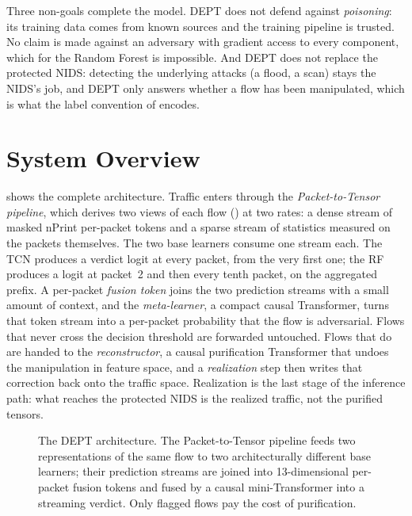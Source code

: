 Three non-goals complete the model. DEPT does not defend against \emph{poisoning}: its
training data comes from known sources and the training pipeline is trusted. No claim
is made against an adversary with gradient access to every component, which for the
Random Forest is impossible. And DEPT does not replace the protected \ac{NIDS}:
detecting the underlying attacks (a flood, a scan) stays the \ac{NIDS}'s job, and DEPT
only answers whether a flow has been manipulated, which is what the label convention of
 encodes.

\section{System Overview}\label{sec:sol-overview}
 shows the complete architecture. Traffic enters through the
\emph{Packet-to-Tensor pipeline}, which derives two views of each flow
() at two rates: a dense stream of masked nPrint per-packet
tokens and a sparse stream of statistics measured on the packets themselves. The two base learners
consume one stream each. The \ac{TCN} produces a verdict logit at every packet, from
the very first one; the \ac{RF} produces a logit at packet~2 and then every tenth
packet, on the aggregated prefix. A per-packet \emph{fusion token} joins the two
prediction streams with a small amount of context, and the \emph{meta-learner}, a
compact causal Transformer, turns that token stream into a per-packet probability that
the flow is adversarial. Flows that never cross the decision threshold are forwarded
untouched. Flows that do are handed to the \emph{reconstructor}, a causal purification
Transformer that undoes the manipulation in feature space, and a \emph{realization} step
then writes that correction back onto the traffic space. Realization is the last
stage of the inference path: what reaches the protected \ac{NIDS} is the realized
traffic, not the purified tensors.

\begin{figure}[htbp]
    \centering
    
    \caption[The DEPT architecture.]{The DEPT architecture. The Packet-to-Tensor
    pipeline feeds two representations of the same flow to two architecturally
    different base learners; their prediction streams are joined into 13-dimensional
    per-packet fusion tokens and fused by a causal mini-Transformer into a streaming
    verdict. Only flagged flows pay the cost of purification.}
    \label{fig:sol-architecture}
\end{figure}

